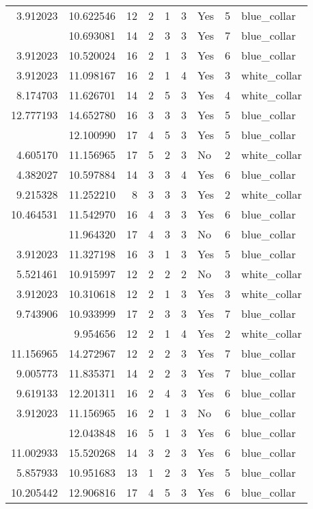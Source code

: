 \documentclass[
]{article}
\begin{document}
\begin{longtable}[t]{rrrrrllrl}
3.912023 & 10.622546 & 12 & 2 & 1 & 3 & Yes & 5 & blue\_collar\\
\addlinespace
7.625595 & 10.693081 & 14 & 2 & 3 & 3 & Yes & 7 & blue\_collar\\
3.912023 & 10.520024 & 16 & 2 & 1 & 3 & Yes & 6 & blue\_collar\\
3.912023 & 11.098167 & 16 & 2 & 1 & 4 & Yes & 3 & white\_collar\\
8.174703 & 11.626701 & 14 & 2 & 5 & 3 & Yes & 4 & white\_collar\\
12.777193 & 14.652780 & 16 & 3 & 3 & 3 & Yes & 5 & blue\_collar\\
\addlinespace
10.670117 & 12.100990 & 17 & 4 & 5 & 3 & Yes & 5 & blue\_collar\\
4.605170 & 11.156965 & 17 & 5 & 2 & 3 & No & 2 & white\_collar\\
4.382027 & 10.597884 & 14 & 3 & 3 & 4 & Yes & 6 & blue\_collar\\
9.215328 & 11.252210 & 8 & 3 & 3 & 3 & Yes & 2 & white\_collar\\
10.464531 & 11.542970 & 16 & 4 & 3 & 3 & Yes & 6 & blue\_collar\\
\addlinespace
7.625595 & 11.964320 & 17 & 4 & 3 & 3 & No & 6 & blue\_collar\\
3.912023 & 11.327198 & 16 & 3 & 1 & 3 & Yes & 5 & blue\_collar\\
5.521461 & 10.915997 & 12 & 2 & 2 & 2 & No & 3 & white\_collar\\
3.912023 & 10.310618 & 12 & 2 & 1 & 3 & Yes & 3 & white\_collar\\
9.743906 & 10.933999 & 17 & 2 & 3 & 3 & Yes & 7 & blue\_collar\\
\addlinespace
3.912023 & 9.954656 & 12 & 2 & 1 & 4 & Yes & 2 & white\_collar\\
11.156965 & 14.272967 & 12 & 2 & 2 & 3 & Yes & 7 & blue\_collar\\
9.005773 & 11.835371 & 14 & 2 & 2 & 3 & Yes & 7 & blue\_collar\\
9.619133 & 12.201311 & 16 & 2 & 4 & 3 & Yes & 6 & blue\_collar\\
3.912023 & 11.156965 & 16 & 2 & 1 & 3 & No & 6 & blue\_collar\\
\addlinespace
3.912023 & 12.043848 & 16 & 5 & 1 & 3 & Yes & 6 & blue\_collar\\
11.002933 & 15.520268 & 14 & 3 & 2 & 3 & Yes & 6 & blue\_collar\\
5.857933 & 10.951683 & 13 & 1 & 2 & 3 & Yes & 5 & blue\_collar\\
10.205442 & 12.906816 & 17 & 4 & 5 & 3 & Yes & 6 & blue\_collar\\

\end{longtable}
\end{document}

